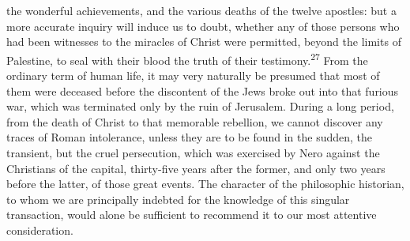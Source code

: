 the wonderful achievements, and the various deaths of the twelve
apostles: but a more accurate inquiry will induce us to doubt,
whether any of those persons who had been witnesses to the
miracles of Christ were permitted, beyond the limits of
Palestine, to seal with their blood the truth of their testimony.\textsuperscript{27}
From the ordinary term of human life, it may very naturally be
presumed that most of them were deceased before the discontent of
the Jews broke out into that furious war, which was terminated
only by the ruin of Jerusalem. During a long period, from the
death of Christ to that memorable rebellion, we cannot discover
any traces of Roman intolerance, unless they are to be found in
the sudden, the transient, but the cruel persecution, which was
exercised by Nero against the Christians of the capital,
thirty-five years after the former, and only two years before the
latter, of those great events. The character of the philosophic
historian, to whom we are principally indebted for the knowledge
of this singular transaction, would alone be sufficient to
recommend it to our most attentive consideration.




